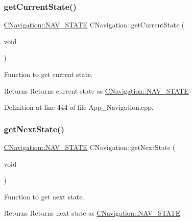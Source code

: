 \subsubsection{\texorpdfstring{getCurrentState()}{getCurrentState()}}
{\footnotesize\ttfamily \mbox{\hyperlink{class_c_navigation_add9fc966c7604990edf5c2a2e0eba32c}{C\+Navigation\+::\+N\+A\+V\+\_\+\+S\+T\+A\+TE}} C\+Navigation\+::get\+Current\+State (\begin{DoxyParamCaption}\item[{void}]{ }\end{DoxyParamCaption})\hspace{0.3cm}{\ttfamily [virtual]}}



Function to get current state. 

\begin{DoxyReturn}{Returns}
Returns current state as \mbox{\hyperlink{class_c_navigation_add9fc966c7604990edf5c2a2e0eba32c}{C\+Navigation\+::\+N\+A\+V\+\_\+\+S\+T\+A\+TE}} 
\end{DoxyReturn}


Definition at line 444 of file App\+\_\+\+Navigation.\+cpp.

\mbox{\label{class_c_navigation_afef253f37646558a755d956ecf2fc6e9}} 
\subsubsection{\texorpdfstring{getNextState()}{getNextState()}}
{\footnotesize\ttfamily \mbox{\hyperlink{class_c_navigation_add9fc966c7604990edf5c2a2e0eba32c}{C\+Navigation\+::\+N\+A\+V\+\_\+\+S\+T\+A\+TE}} C\+Navigation\+::get\+Next\+State (\begin{DoxyParamCaption}\item[{void}]{ }\end{DoxyParamCaption})\hspace{0.3cm}{\ttfamily [virtual]}}



Function to get next state. 

\begin{DoxyReturn}{Returns}
Returns next state as \mbox{\hyperlink{class_c_navigation_add9fc966c7604990edf5c2a2e0eba32c}{C\+Navigation\+::\+N\+A\+V\+\_\+\+S\+T\+A\+TE}} 
\end{DoxyReturn}


